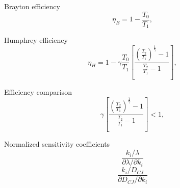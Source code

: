 \documentclass[12pt]{article}
\begin{document}
	Brayton efficiency
     \begin{equation}
         \eta_{B} = 1 - \frac{T_{0}}{T_{1}},
     \end{equation}

     Humphrey efficiency
     \begin{equation}
         \eta_{H} = 1 - \gamma \frac{T_{0}}{T_{1}} \left[ \frac{\left( \frac{T_{2}}{T_{1}} \right)^{\frac{1}{\gamma}} - 1}{ \frac{T_{2}}{T_{1}} - 1} \right],
     \end{equation}

	Efficiency comparison
     \begin{equation}
         \gamma \left[ \frac{\left( \frac{T_{2}}{T_{1}} \right)^{\frac{1}{\gamma}} - 1}{ \frac{T_{2}}{T_{1}} - 1} \right] < 1,
     \end{equation}
     
     Normalized sensitivity coefficients
     \begin{equation}
		\frac{k_{i} / \lambda}{\partial \lambda / \partial k_{i}}
	\end{equation}
     \begin{equation}
		\frac{k_{i} / D_{CJ}}{\partial D_{CJ} / \partial k_{i}}
	\end{equation}
\end{document}
